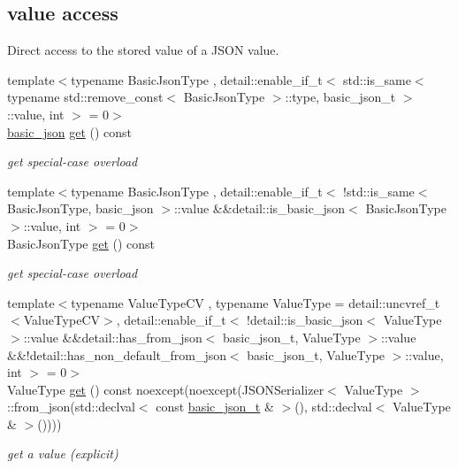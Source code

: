 \subsection*{value access}
\label{_amgrpd8f53c9caf18314e5b3f758245606995}%
Direct access to the stored value of a J\+S\+ON value. \begin{DoxyCompactItemize}
\item 
{\footnotesize template$<$typename Basic\+Json\+Type , detail\+::enable\+\_\+if\+\_\+t$<$ std\+::is\+\_\+same$<$ typename std\+::remove\+\_\+const$<$ Basic\+Json\+Type $>$\+::type, basic\+\_\+json\+\_\+t $>$\+::value, int $>$  = 0$>$ }\\\hyperlink{classnlohmann_1_1basic__json}{basic\+\_\+json} \hyperlink{classnlohmann_1_1basic__json_ab513e91d419a880ee59e559e05586db6}{get} () const 
\begin{DoxyCompactList}\small\item\em get special-\/case overload \end{DoxyCompactList}\item 
{\footnotesize template$<$typename Basic\+Json\+Type , detail\+::enable\+\_\+if\+\_\+t$<$ !std\+::is\+\_\+same$<$ Basic\+Json\+Type, basic\+\_\+json $>$\+::value \&\&detail\+::is\+\_\+basic\+\_\+json$<$ Basic\+Json\+Type $>$\+::value, int $>$  = 0$>$ }\\Basic\+Json\+Type \hyperlink{classnlohmann_1_1basic__json_a26b731f8d3f022c9dab85222646319ac}{get} () const 
\begin{DoxyCompactList}\small\item\em get special-\/case overload \end{DoxyCompactList}\item 
{\footnotesize template$<$typename Value\+Type\+CV , typename Value\+Type  = detail\+::uncvref\+\_\+t$<$\+Value\+Type\+C\+V$>$, detail\+::enable\+\_\+if\+\_\+t$<$ !detail\+::is\+\_\+basic\+\_\+json$<$ Value\+Type $>$\+::value \&\&detail\+::has\+\_\+from\+\_\+json$<$ basic\+\_\+json\+\_\+t, Value\+Type $>$\+::value \&\&!detail\+::has\+\_\+non\+\_\+default\+\_\+from\+\_\+json$<$ basic\+\_\+json\+\_\+t, Value\+Type $>$\+::value, int $>$  = 0$>$ }\\Value\+Type \hyperlink{classnlohmann_1_1basic__json_a91198163e5ffd34d361d2db77cb1f112}{get} () const noexcept(noexcept(J\+S\+O\+N\+Serializer$<$ Value\+Type $>$\+::from\+\_\+json(std\+::declval$<$ const \hyperlink{classnlohmann_1_1basic__json_a125c0afa5f3599949b0589ef7b4aa322}{basic\+\_\+json\+\_\+t} \& $>$(), std\+::declval$<$ Value\+Type \& $>$())))
\begin{DoxyCompactList}\small\item\em get a value (explicit) \end{DoxyCompactList}\item 

\end{DoxyCompactItemize}
